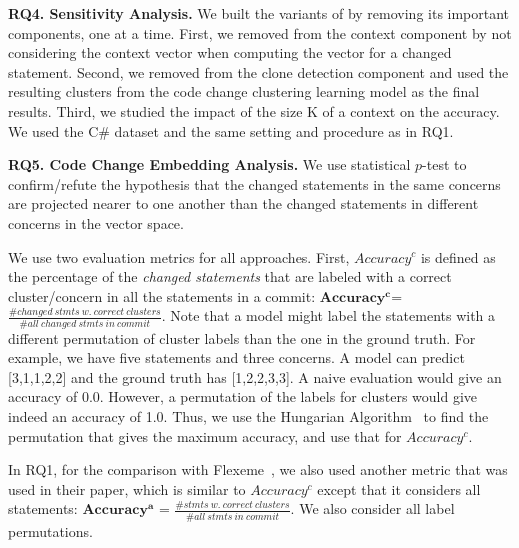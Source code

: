 \noindent\textbf{RQ4. Sensitivity Analysis.} We built the variants of {\tool} by removing its important components,
one at a time. First, we removed from {\tool} the context component by
not considering the context vector when computing the vector
for a changed statement. Second, we removed from {\tool} the
clone detection component and used the resulting clusters from the
code change clustering learning model as the final results. Third, we studied the impact of the size K of a context on the accuracy. 
We used the C\# dataset and the same setting and procedure as in RQ1.


\noindent\textbf{RQ5. Code Change Embedding Analysis.} We use statistical $p$-test to confirm/refute the hypothesis
that the changed statements in the same concerns are
projected nearer to one another than the changed statements in
different concerns in the vector space.



\vspace{3pt}
 We use two evaluation metrics for
all approaches. First, $Accuracy^{c}$ is defined as the percentage of
the {\em changed statements} that are labeled with a correct
cluster/concern in all the statements in a commit: $\mathbf{Accuracy^{c}}$=
$\frac{\# changed\:stmts\:w.\:correct\:clusters}{\#
all\:changed\:stmts\:in\:commit}$.  Note that a model might label the
statements with a different permutation of cluster labels than the one
in the ground truth. For example, we have five statements and three
concerns. A model can predict [3,1,1,2,2] and the ground truth has
[1,2,2,3,3]. A naive evaluation would give an accuracy of
0.0. However, a permutation of the labels for clusters would give
indeed an accuracy of 1.0. Thus, we use the Hungarian
Algorithm~\cite{hungarian-algo} to find the permutation that gives the
maximum accuracy, and use that for $Accuracy^{c}$.

In RQ1, for the comparison with Flexeme~\cite{flexeme-fse20}, we also
used another metric that was used in their paper, which is similar to
$Accuracy^{c}$ except that it considers all statements: $\mathbf{Accuracy^{a}}$
= $\frac{\# stmts\:w.\:correct\:clusters}{\# all\:stmts\:in\:commit}$.
We also consider all label permutations.


